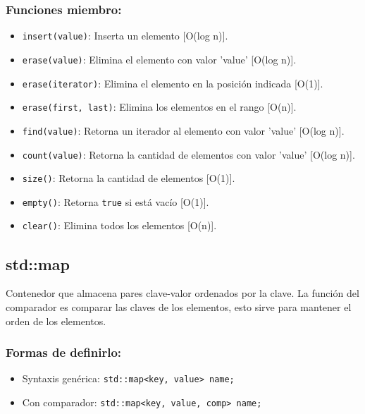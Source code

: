 \subsubsection*{Funciones miembro:}
\begin{itemize}
  \item \texttt{insert(value)}: Inserta un elemento [O(log n)]. 
  \item \texttt{erase(value)}: Elimina el elemento con valor 'value' [O(log n)].
  \item \texttt{erase(iterator)}: Elimina el elemento en la posición indicada [O(1)].
  \item \texttt{erase(first, last)}: Elimina los elementos en el rango [O(n)].
  \item \texttt{find(value)}: Retorna un iterador al elemento con valor 'value' [O(log n)]. 
  \item \texttt{count(value)}: Retorna la cantidad de elementos con valor 'value' [O(log n)]. 
  \item \texttt{size()}: Retorna la cantidad de elementos [O(1)]. 
  \item \texttt{empty()}: Retorna \texttt{true} si está vacío [O(1)]. 
  \item \texttt{clear()}: Elimina todos los elementos [O(n)]. 
\end{itemize}

\subsection{std::map}
\label{subsec:std_map}
Contenedor que almacena pares clave-valor ordenados por la clave. La función del comparador es comparar las claves de los elementos, esto sirve para mantener el orden de los elementos.

\subsubsection*{Formas de definirlo:}
\begin{itemize}
  \item Syntaxis genérica: \texttt{std::map<key, value> name;}
  \item Con comparador: \texttt{std::map<key, value, comp> name;}
\end{itemize}

